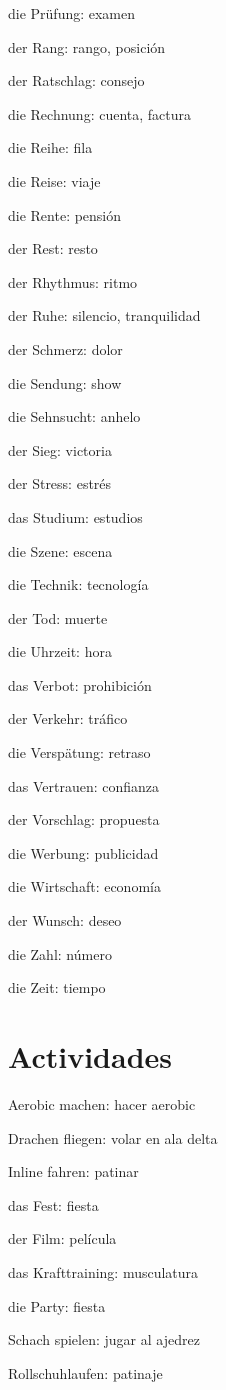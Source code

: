 \begin{multicols}{2}
\begin{myitemize}
\item die Prüfung: examen
\item der Rang: rango, posición
\item der Ratschlag: consejo
\item die Rechnung: cuenta, factura
\item die Reihe: fila
\item die Reise: viaje
\item die Rente: pensión
\item der Rest: resto
\item der Rhythmus: ritmo
\item der Ruhe: silencio, tranquilidad
\item der Schmerz: dolor
\item die Sendung: show
\item die Sehnsucht: anhelo
\item der Sieg: victoria
\item der Stress: estrés
\item das Studium: estudios
\item die Szene: escena
\item die Technik: tecnología
\item der Tod: muerte
\item die Uhrzeit: hora
\item das Verbot: prohibición
\item der Verkehr: tráfico
\item die Verspätung: retraso
\item das Vertrauen: confianza
\item der Vorschlag: propuesta
\item die Werbung: publicidad
\item die Wirtschaft: economía
\item der Wunsch: deseo
\item die Zahl: número
\item die Zeit: tiempo
\end{myitemize}
\end{multicols}

\section{Actividades}
\begin{multicols}{2}
\begin{myitemize}
\item Aerobic machen: hacer aerobic
\item Drachen fliegen: volar en ala delta
\item Inline fahren: patinar
\item das Fest: fiesta
\item der Film: película
\item das Krafttraining: musculatura
\item die Party: fiesta
\item Schach spielen: jugar al ajedrez
\item Rollschuhlaufen: patinaje
\end{myitemize}
\end{multicols}

